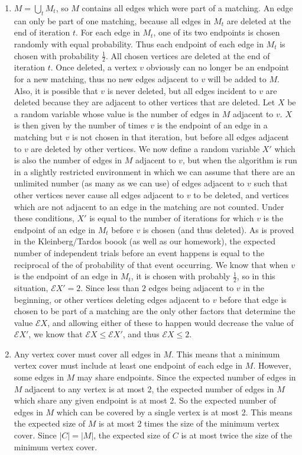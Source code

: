 \documentclass{article}
\begin{document}
\begin{enumerate}
\begin{enumerate}
\item $M = \bigcup_t M_t$, so $M$ contains all edges which were part of a matching.  An edge can only be part of one matching, because all edges in $M_t$ are deleted at the end of iteration $t$. For each edge in $M_t$, one of its two endpoints is chosen randomly with equal probability.  Thus each endpoint of each edge in $M_t$ is chosen with probability $\frac{1}{2}$. All chosen vertices are deleted at the end of iteration $t$. Once deleted, a vertex $v$ obviously can no longer be an endpoint for a new matching, thus no new edges adjacent to $v$ will be added to $M$. Also, it is possible that $v$ is never deleted, but all edges incident to $v$ are deleted because they are adjacent to other vertices that are deleted.  Let $X$ be a random variable whose value is the number of edges in $M$ adjacent to $v$. $X$ is then given by the number of times $v$ is the endpoint of an edge in a matching but $v$ is not chosen in that iteration, but before all edges adjacent to $v$ are deleted by other vertices.   We now define a random variable $X'$ which is also the number of edges in $M$ adjacent to $v$, but when the algorithm is run in a slightly restricted environment in which we can assume that there are an unlimited number (as many as we can use) of edges adjacent to $v$ such that other vertices never cause all edges adjacent to $v$ to be deleted, and vertices which are not adjacent to an edge in the matching are not counted. Under these conditions, $X'$ is equal to the number of iterations for which $v$ is the endpoint of an edge in $M_t$ before $v$ is chosen (and thus deleted). As is proved in the Kleinberg/Tardos boook (as well as our homework), the expected number of independent trials before an event happens is equal to the reciprocal of the of probability of that event occurring.  We know that when $v$ is the endpoint of an edge in $M_t$, it is chosen with probably $\frac{1}{2}$, so in this situation, $\mathcal{E}X' = 2$. Since less than $2$ edges being adjacent to $v$ in the beginning, or other vertices deleting edges adjacent to $v$ before that edge is chosen to be part of a matching are the only other factors that determine the value $\mathcal{E}X$, and allowing either of these to happen would decrease the value of $\mathcal{E}X'$, we know that $\mathcal{E}X \leq \mathcal{E}X'$, and thus $\mathcal{E}X \leq 2$.

\item Any vertex cover must cover all edges in $M$. This means that a minimum vertex cover must include at least one endpoint of each edge in $M$.  However, some edges in $M$ may share endpoints. Since the expected number of edges in $M$ adjacent to any vertex is at most 2, the expected number of edges in $M$ which share any given endpoint is at most 2. So the expected number of edges in $M$ which can be covered by a single vertex is at most 2. This means the expected size of $M$ is at most 2 times the size of the minimum vertex cover.  Since $|C| = |M|$, the expected size of $C$ is at most twice the size of the minimum vertex cover.


\end{enumerate}
\end{enumerate}
\end{document}
